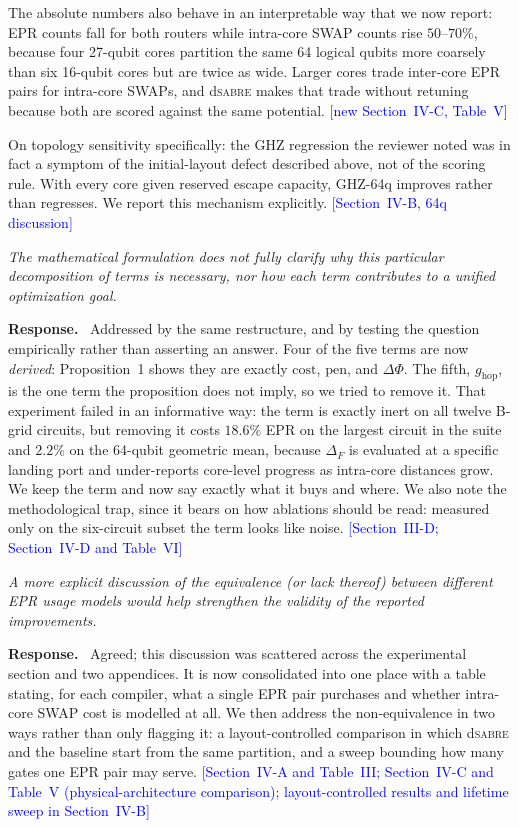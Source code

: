 \documentclass[11pt]{article}
\newcommand{\dSABRE}{d\textsc{sabre}}
\newenvironment{comment}{\medskip\noindent\itshape}{\par}
\newcommand{\response}{\smallskip\noindent\textbf{Response.}\ }
\newcommand{\where}[1]{\textcolor{blue}{[#1]}}
\begin{document}
The absolute numbers also behave in an interpretable way that we now
report: EPR counts fall for both routers while intra-core SWAP counts
rise $50$--$70\%$, because four 27-qubit cores partition the same 64
logical qubits more coarsely than six 16-qubit cores but are twice as
wide.  Larger cores trade inter-core EPR pairs for intra-core SWAPs,
and \dSABRE{} makes that trade without retuning because both are scored
against the same potential.
\where{new Section~IV-C, Table~V}

On topology sensitivity specifically: the GHZ regression the reviewer
noted was in fact a symptom of the initial-layout defect described
above, not of the scoring rule.  With every core given reserved escape
capacity, GHZ-64q improves rather than regresses.  We report this
mechanism explicitly.
\where{Section~IV-B, 64q discussion}

\begin{comment}
The mathematical formulation does not fully clarify why this particular
decomposition of terms is necessary, nor how each term contributes to a
unified optimization goal.
\end{comment}

\response
Addressed by the same restructure, and by testing the question
empirically rather than asserting an answer.  Four of the five terms
are now \emph{derived}: Proposition~1 shows they are exactly
$\mathrm{cost}$, $\mathrm{pen}$, and $\Delta\Phi$.  The fifth,
$g_\mathrm{hop}$, is the one term the proposition does not imply, so we
tried to remove it.  That experiment failed in an informative way: the
term is exactly inert on all twelve B-grid circuits, but removing it
costs $18.6\%$ EPR on the largest circuit in the suite and $2.2\%$ on
the 64-qubit geometric mean, because $\Delta_F$ is evaluated at a
specific landing port and under-reports core-level progress as
intra-core distances grow.  We keep the term and now say exactly what
it buys and where.  We also note the methodological trap, since it bears
on how ablations should be read: measured only on the six-circuit
subset the term looks like noise.
\where{Section~III-D; Section~IV-D and Table~VI}

\begin{comment}
A more explicit discussion of the equivalence (or lack thereof) between
different EPR usage models would help strengthen the validity of the
reported improvements.
\end{comment}

\response
Agreed; this discussion was scattered across the experimental section
and two appendices.  It is now consolidated into one place with a
table stating, for each compiler, what a single EPR pair purchases and
whether intra-core SWAP cost is modelled at all.  We then address the
non-equivalence in two ways rather than only flagging it: a
layout-controlled comparison in which \dSABRE{} and the baseline start
from the same partition, and a sweep bounding how many gates one EPR
pair may serve.
\where{Section~IV-A and Table~III; Section~IV-C and Table~V
(physical-architecture comparison); layout-controlled results and
lifetime sweep in Section~IV-B}
\end{document}
